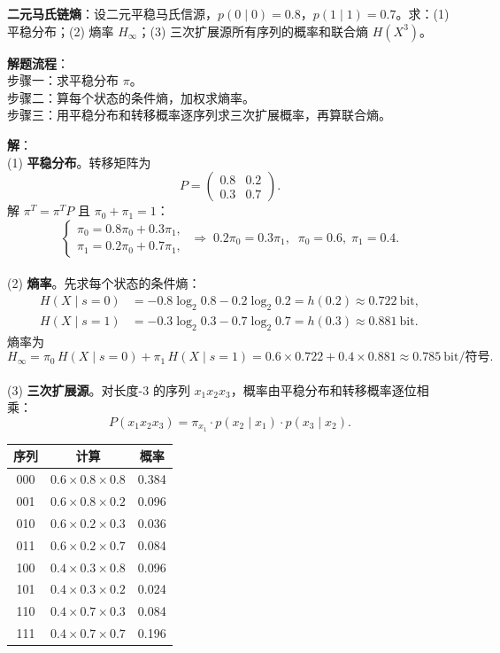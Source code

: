 \begin{example}
\label{ex:markov-entropy}
\textbf{二元马氏链熵}：设二元平稳马氏信源，$p(0\mid 0)=0.8$，$p(1\mid 1)=0.7$。求：(1) 平稳分布；(2) 熵率 $H_\infty$；(3) 三次扩展源所有序列的概率和联合熵 $H(X^3)$。

\noindent \textbf{解题流程}：\\[2pt]
步骤一：求平稳分布 $\pi$。\\
步骤二：算每个状态的条件熵，加权求熵率。\\
步骤三：用平稳分布和转移概率逐序列求三次扩展概率，再算联合熵。

\noindent \textbf{解}：\\[2pt]
(1) \textbf{平稳分布}。转移矩阵为
\[
P=\begin{pmatrix}0.8&0.2\\0.3&0.7\end{pmatrix}.
\]
解 $\pi^T=\pi^T P$ 且 $\pi_0+\pi_1=1$：
\[
\begin{cases}
\pi_0=0.8\pi_0+0.3\pi_1,\\
\pi_1=0.2\pi_0+0.7\pi_1,
\end{cases}
\;\Longrightarrow\; 0.2\pi_0=0.3\pi_1,\;\; \pi_0=0.6,\;\pi_1=0.4.
\]\\[4pt]
(2) \textbf{熵率}。先求每个状态的条件熵：
\begin{align*}
H(X\mid s=0) &= -0.8\log_2 0.8-0.2\log_2 0.2 = h(0.2)\approx 0.722\ \text{bit},\\
H(X\mid s=1) &= -0.3\log_2 0.3-0.7\log_2 0.7 = h(0.3)\approx 0.881\ \text{bit}.
\end{align*}
熵率为
\[
H_\infty = \pi_0\,H(X\mid s=0)+\pi_1\,H(X\mid s=1)
         =0.6\times0.722+0.4\times0.881\approx 0.785\ \text{bit/符号}.
\]\\[4pt]
(3) \textbf{三次扩展源}。对长度-3 的序列 $x_1x_2x_3$，概率由平稳分布和转移概率逐位相乘：
\[
P(x_1x_2x_3)=\pi_{x_1}\cdot p(x_2\mid x_1)\cdot p(x_3\mid x_2).
\]

{\small
\begin{center}
\begin{tabular}{c|c|c}
\toprule
\textbf{序列} & \textbf{计算} & \textbf{概率}\\
\midrule
000 & $0.6\times0.8\times0.8$ & 0.384\\
001 & $0.6\times0.8\times0.2$ & 0.096\\
010 & $0.6\times0.2\times0.3$ & 0.036\\
011 & $0.6\times0.2\times0.7$ & 0.084\\
100 & $0.4\times0.3\times0.8$ & 0.096\\
101 & $0.4\times0.3\times0.2$ & 0.024\\
110 & $0.4\times0.7\times0.3$ & 0.084\\
111 & $0.4\times0.7\times0.7$ & 0.196\\
\bottomrule
\end{tabular}
\end{center}
}


\end{example}
